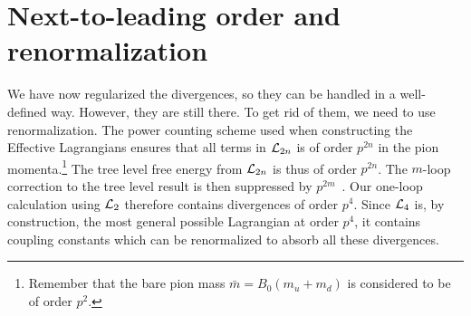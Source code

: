 \section{Next-to-leading order and renormalization}
We have now regularized the divergences, so they can be handled in a well-defined way.
However, they are still there.
To get rid of them, we need to use renormalization.
The power counting scheme used when constructing the Effective Lagrangians ensures that all terms in $\mathcal{L}_{2n}$ is of order $p^{2n}$ in the pion momenta.\footnote{Remember that the bare pion mass $\bar m = B_0(m_u + m_d)$ is considered to be of order $p^2$.}
The tree level free energy from $\mathcal{L}_{2n}$ is thus of order $p^{2n}$.
The $m$-loop correction to the tree level result is then suppressed by $p^{2m}$~\cite{WeinbergPhenom,Gasser-Leutwyler:chiral}.
Our one-loop calculation using $\mathcal{L}_2$ therefore contains divergences of order $p^{4}$. 
Since $\mathcal{L}_4$ is, by construction, the most general possible Lagrangian at order $p^4$, it contains coupling constants which can be renormalized to absorb all these divergences.

